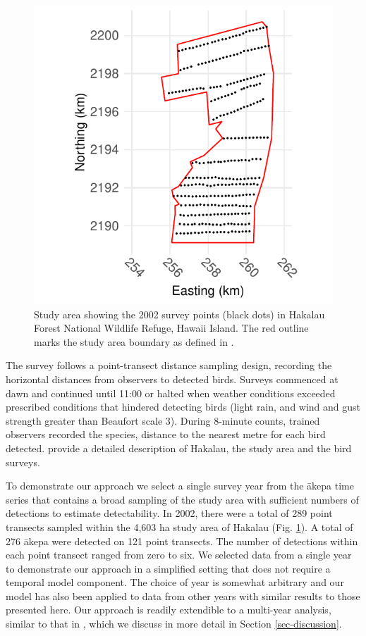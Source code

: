 \documentclass{statsoc}
\newcommand{\akepa}{\textquotesingle\={a}kepa}  %
\newcommand{\hawaii}{Hawai\textquotesingle i}   %
\begin{document}
\begin{figure}[!htb]
	\centering
	\includegraphics{figures/study_area_design.pdf}
	\caption{Study area showing the 2002 survey points (black dots) in Hakalau Forest National Wildlife Refuge, \hawaii{} Island.  The red outline marks the study area boundary as defined in \cite{camp_dsm_2020}.}
	\label{fig:2002studyareapointspt}
\end{figure}

The survey follows a point-transect distance sampling design, recording the horizontal distances from observers to detected birds. Surveys commenced at dawn and continued until 11:00 or halted when weather conditions exceeded prescribed conditions that hindered detecting birds (light rain, and wind and gust strength greater than Beaufort scale 3). During 8-minute counts, trained observers recorded the species, distance to the nearest metre for each bird detected. \cite{camp_population_2010,camp_statespace_2016} provide a detailed description of Hakalau, the study area and the bird surveys.

To demonstrate our approach we select a single survey year from the \akepa{} time series that contains a broad sampling of the study area with sufficient numbers of detections to estimate detectability. In 2002, there were a total of 289 point transects sampled within the 4,603 ha study area of Hakalau (Fig. \ref{fig:2002studyareapointspt}).  A total of 276 \akepa{} were detected on 121 point transects. The number of detections within each point transect ranged from zero to six. We selected data from a single year to demonstrate our approach in a simplified setting that does not require a temporal model component.  The choice of year is somewhat arbitrary and our model has also been applied to data from other years with similar results to those presented here.  Our approach is readily extendible to a multi-year analysis, similar to that in \cite{camp_dsm_2020}, which we discuss in more detail in Section \ref{sec-discussion}.
\end{document}
